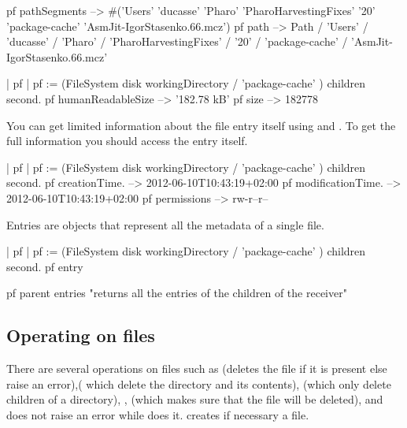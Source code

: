 \documentclass[a4paper,10pt,twoside]{book}
\begin{document}
\begin{code}{}
pf pathSegments  
	-->  #('Users' 'ducasse' 'Pharo' 'PharoHarvestingFixes' '20' 'package-cache' 'AsmJit-IgorStasenko.66.mcz')
pf path
    -->  Path / 'Users' / 'ducasse' / 'Pharo' / 'PharoHarvestingFixes' / '20' / 'package-cache' / 'AsmJit-IgorStasenko.66.mcz'
\end{code}



\begin{code}{}
| pf |
pf := (FileSystem disk workingDirectory / 'package-cache' ) children second.
pf humanReadableSize 
	--> '182.78 kB'
pf size 
	--> 182778
\end{code}  


You can get limited information about the file entry itself using  and . 
To get the full information you should access the entry itself.

\begin{code}{}
| pf |
pf := (FileSystem disk workingDirectory / 'package-cache' ) children second.
pf creationTime.
	--> 2012-06-10T10:43:19+02:00
pf modificationTime.
	-->  2012-06-10T10:43:19+02:00
pf permissions
	-->  rw-r--r--
\end{code}

Entries are objects that represent all the metadata of a single file. 
\begin{code}{}
| pf |
pf := (FileSystem disk workingDirectory / 'package-cache' ) children second.
pf entry

pf parent entries
	"returns all the entries of the children of the receiver"
\end{code}


\subsection{Operating on files}
There are several operations on files such as  (deletes the file if it is present else raise an error),( which delete the directory and its contents),  (which only delete children of a directory), ,  (which makes sure that the file will be deleted), and  does not raise an error while  does it.  creates if necessary a file.

\end{document}
